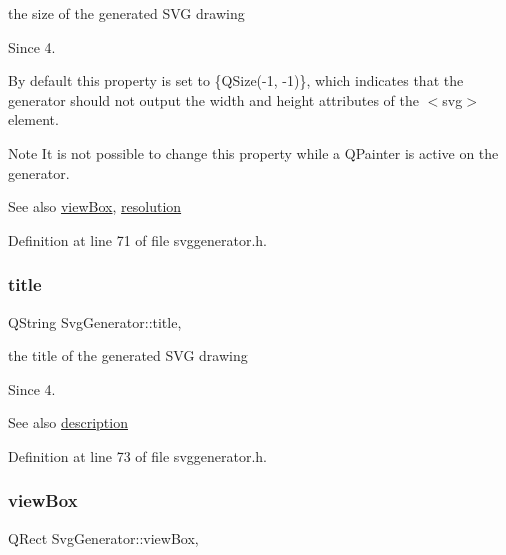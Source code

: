 the size of the generated S\+VG drawing 

\begin{DoxySince}{Since}
4.
\end{DoxySince}
By default this property is set to {\ttfamily }\{Q\+Size(-\/1, -\/1)\}, which indicates that the generator should not output the width and height attributes of the {\ttfamily } $<$svg$>$ element.

\begin{DoxyNote}{Note}
It is not possible to change this property while a Q\+Painter is active on the generator.
\end{DoxyNote}
\begin{DoxySeeAlso}{See also}
\hyperlink{class_svg_generator_a4a56c80b10833a8ded8715652d67afe2}{view\+Box}, \hyperlink{class_svg_generator_a3d8c9548b882f99b74b011e965b01a2e}{resolution} 
\end{DoxySeeAlso}


Definition at line 71 of file svggenerator.\+h.

\mbox{\label{class_svg_generator_abe9c2cd9446061e16cfdea2fa7eb777d}} 
\subsubsection{\texorpdfstring{title}{title}}
{\footnotesize\ttfamily Q\+String Svg\+Generator\+::title\hspace{0.3cm}{\ttfamily [read]}, {\ttfamily [write]}}



the title of the generated S\+VG drawing 

\begin{DoxySince}{Since}
4. 
\end{DoxySince}
\begin{DoxySeeAlso}{See also}
\hyperlink{class_svg_generator_ad59f1e13a42ee64b2d354f29a5255cea}{description} 
\end{DoxySeeAlso}


Definition at line 73 of file svggenerator.\+h.

\mbox{\label{class_svg_generator_a4a56c80b10833a8ded8715652d67afe2}} 
\subsubsection{\texorpdfstring{view\+Box}{viewBox}}
{\footnotesize\ttfamily Q\+Rect Svg\+Generator\+::view\+Box\hspace{0.3cm}{\ttfamily [read]}, {\ttfamily [write]}}



